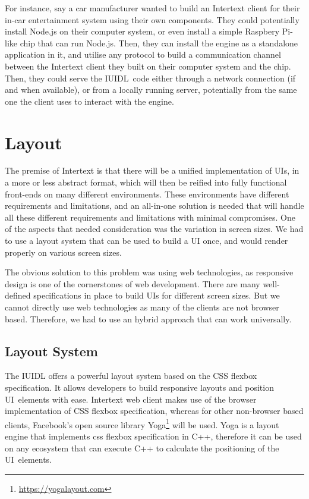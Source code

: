 For instance, say a car manufacturer wanted to build an Intertext client for their in-car entertainment system using their own components. They could potentially install Node.js on their computer system, or even install a simple Raspbery Pi-like chip that can run Node.js. Then, they can install the engine as a standalone application in it, and utilise any protocol to build a communication channel between the Intertext client they built on their computer system and the chip. Then, they could serve the IUIDL~code either through a network connection (if and when available), or from a locally running server, potentially from the same one the client uses to interact with the engine. 

\section{Layout}

The premise of Intertext is that there will be a unified implementation of UIs, in a more or less abstract format, which will then be reified into fully functional front-ends on many different environments. These environments have different requirements and limitations, and an all-in-one solution is needed that will handle all these different requirements and limitations with minimal compromises. One of the aspects that needed consideration was the variation in screen sizes. We had to use a layout system that can be used to build a UI once, and would render properly on various screen sizes.

The obvious solution to this problem was using web technologies, as responsive design is one of the cornerstones of web development. There are many well-defined specifications in place to build UIs for different screen sizes. But we cannot directly use web technologies as many of the clients are not browser based. Therefore, we had to use an hybrid approach that can work universally.

\subsection{Layout System}

The IUIDL offers a powerful layout system based on the CSS flexbox specification. It allows developers to build responsive layouts and position UI~elements with ease. Intertext web client makes use of the browser implementation of CSS flexbox specification, whereas for other non-browser based clients, Facebook's open source library Yoga\footnote{\url{https://yogalayout.com}} will be used. Yoga is a layout engine that implements css flexbox specification in C++, therefore it can be used on any ecosystem that can execute C++ to calculate the positioning of the UI~elements.

